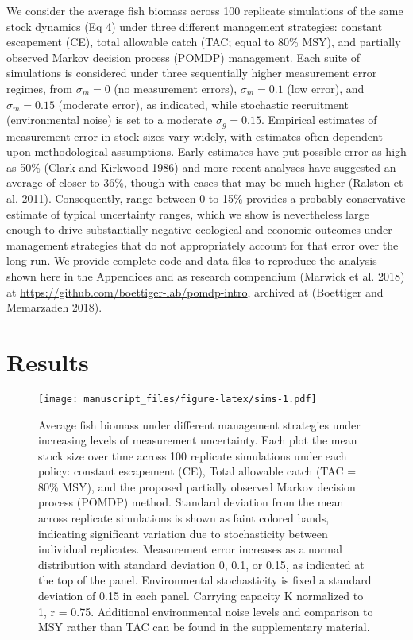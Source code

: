 \documentclass[3p]{elsarticle} %
\makeatletter
\def\maxwidth{\ifdim\Gin@nat@width>\linewidth\linewidth
\else\Gin@nat@width\fi}
\let\Oldincludegraphics\includegraphics
\renewcommand{\includegraphics}[1]{\Oldincludegraphics[width=\maxwidth]{#1}}
\makeatother
\begin{document}
We consider the average fish biomass across 100 replicate simulations of
the same stock dynamics (Eq 4) under three different management
strategies: constant escapement (CE), total allowable catch (TAC; equal
to 80\% MSY), and partially observed Markov decision process (POMDP)
management. Each suite of simulations is considered under three
sequentially higher measurement error regimes, from \(\sigma_m = 0\) (no
measurement errors), \(\sigma_m = 0.1\) (low error), and
\(\sigma_m = 0.15\) (moderate error), as indicated, while stochastic
recruitment (environmental noise) is set to a moderate
\(\sigma_g = 0.15\). Empirical estimates of measurement error in stock
sizes vary widely, with estimates often dependent upon methodological
assumptions. Early estimates have put possible error as high as 50\%
(Clark and Kirkwood 1986) and more recent analyses have suggested an
average of closer to 36\%, though with cases that may be much higher
(Ralston et al. 2011). Consequently, range between 0 to 15\% provides a
probably conservative estimate of typical uncertainty ranges, which we
show is nevertheless large enough to drive substantially negative
ecological and economic outcomes under management strategies that do not
appropriately account for that error over the long run. We provide
complete code and data files to reproduce the analysis shown here in the
Appendices and as research compendium (Marwick et al. 2018) at
\url{https://github.com/boettiger-lab/pomdp-intro}, archived at
(Boettiger and Memarzadeh 2018).

\hypertarget{results}{%
\section{Results}\label{results}}

\begin{figure}
\centering
\texttt{[image: manuscript\_files/figure-latex/sims-1.pdf]}
\caption{Average fish biomass under different management strategies
under increasing levels of measurement uncertainty. Each plot the mean
stock size over time across 100 replicate simulations under each policy:
constant escapement (CE), Total allowable catch (TAC = 80\% MSY), and
the proposed partially observed Markov decision process (POMDP) method.
Standard deviation from the mean across replicate simulations is shown
as faint colored bands, indicating significant variation due to
stochasticity between individual replicates. Measurement error increases
as a normal distribution with standard deviation 0, 0.1, or 0.15, as
indicated at the top of the panel. Environmental stochasticity is fixed
a standard deviation of 0.15 in each panel. Carrying capacity K
normalized to 1, r = 0.75. Additional environmental noise levels and
comparison to MSY rather than TAC can be found in the supplementary
material. \label{sims}}
\end{figure}
\end{document}
